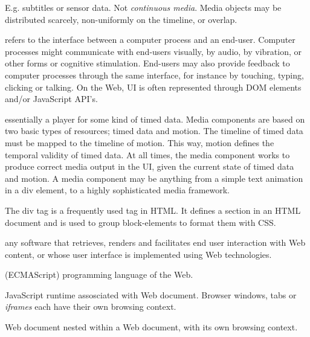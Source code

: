E.g. subtitles or sensor data. Not \emph{continuous media}.
Media objects may be distributed scarcely, non-uniformly on the
timeline, or overlap.


refers to the interface between a computer process and an end-user. Computer
processes might communicate with end-users visually, by audio, by vibration,
or other forms or cognitive stimulation. End-users may also provide feedback
to computer processes through the same interface, for instance by touching,
typing, clicking or talking. On the Web, UI is often represented through DOM
elements and/or JavaScript API’s.


essentially a player for some kind of timed data. Media components are based
on two basic types of resources; timed data and motion. The timeline of timed
data must be mapped to the timeline of motion. This way, motion defines the
temporal validity of timed data. At all times, the media component works to
produce correct media output in the UI, given the current state of timed data
and motion. A media component may be anything from a simple text animation in
a div element, to a highly sophisticated media framework.


The div tag is a frequently used tag in HTML. It defines a section in an
HTML document and is used to group block-elements to format them with CSS.


any software that retrieves, renders and facilitates end user interaction with
Web content, or whose user interface is implemented using Web technologies.


(ECMAScript) programming language of the Web. 


JavaScript runtime assosciated with Web document. Browser windows, tabs or
\emph{iframes} each have their own browsing context.


Web document nested within a Web document, with its own browsing context.
